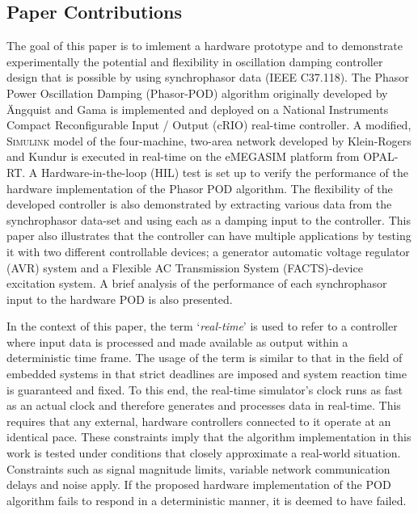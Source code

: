 \documentclass{ieeeaccess}
\begin{document}
\subsection{Paper Contributions}
The goal of this paper is to imlement a hardware prototype and to demonstrate experimentally the potential and flexibility in oscillation damping controller design that is possible by using synchrophasor data (IEEE C37.118). The Phasor Power Oscillation Damping (Phasor-POD) algorithm originally developed by \"{A}ngquist and Gama\cite{PhasorPOD} is implemented and deployed on a National Instruments Compact Reconfigurable Input / Output (cRIO) real-time controller. A modified, \textsc{Simulink} model of the four-machine, two-area network developed by Klein-Rogers and Kundur \cite{KundurTwoArea} is executed in real-time on the eMEGASIM \cite{eMEGASIM} platform from OPAL-RT. A Hardware-in-the-loop (HIL) test is set up to verify the performance of the hardware implementation of the Phasor POD algorithm. The flexibility of the developed controller is also demonstrated by extracting various data from the synchrophasor data-set and using each as a damping input to the controller. This paper also illustrates that the controller can have multiple applications by testing it with two different controllable devices; a generator automatic voltage regulator (AVR) system and a Flexible AC Transmission System (FACTS)-device excitation system. A brief analysis of the performance of each synchrophasor input to the hardware POD is also presented.

In the context of this paper, the term `\emph{real-time}' is used to refer to a controller where input data is processed and made available as output within a deterministic time frame. The usage of the term is similar to that in the field of embedded systems in that strict deadlines are imposed and system reaction time is guaranteed and fixed. To this end, the real-time simulator's clock runs as fast as an actual clock and therefore generates and processes data in real-time. This requires that any external, hardware controllers connected to it operate at an identical pace. These constraints imply that the algorithm implementation in this work is tested under conditions that closely approximate a real-world situation. Constraints such as signal magnitude limits, variable network communication delays and noise apply. If the proposed hardware implementation of the POD algorithm fails to respond in a deterministic manner, it is deemed to have failed.
\end{document}
